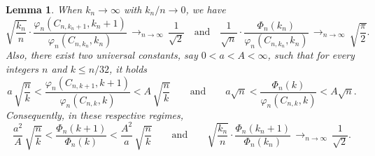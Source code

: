 \documentclass[JEP,XML,SOM,Unicode,NoFloatCountersInSection,NoEqCountersInSection]{cedram}
\theoremstyle{plain}
\newtheorem{lemma}[theorem]{Lemma}
\theoremstyle{definition}
\theoremstyle{remark}
\newcommand{\cv}[1][n]{\,\mathop{\longrightarrow}^{}_{#1 \to \infty}\,}
\begin{document}
\begin{lemma}\label{lem:phi_et_Phi}
When $k_n\to\infty$ with $k_n/n\to0$, we have
\begin{equation}\label{eq:equiv_kn}
\sqrt{\frac{k_n}{n}} \cdot \frac{\varphi_n(C_{n,k_n+1},k_n+1)}{\varphi_n(C_{n,k_n},k_n)} \cv \frac{1}{\sqrt{2}}
\quad\text{and}\quad
\frac{1}{\sqrt{n}} \cdot \frac{\Phi_n(k_n)}{\varphi_{n}(C_{n,k_n},k_n)} \cv \sqrt{\frac{\pi}{2}}.
\end{equation}
Also, there exist two universal constants, say $0 < a < A < \infty$, such that for every integers $n$ and $k \le n/32$, it holds
\begin{equation}\label{eq:bornes_ratio}
a\,\sqrt{\frac{n}{k}} < \frac{\varphi_n(C_{n,k+1},k+1)}{\varphi_n(C_{n,k},k)} < A\,\sqrt{\frac{n}{k}}
\qquad\text{and}\qquad
a\sqrt{n} < \frac{\Phi_n(k)}{\varphi_{n}(C_{n,k},k)} < A \sqrt{n}.
\end{equation}
Consequently, in these respective regimes,
\[
\frac{a^2}{A}\,\sqrt{\frac{n}{k}}
< \frac{\Phi_n(k+1)}{\Phi_n(k)}
< \frac{A^2}{a}\,\sqrt{\frac{n}{k}}
\qquad\text{and}\qquad
\sqrt{\frac{k_n}{n}} \cdot \frac{\Phi_n(k_n+1)}{\Phi_n(k_n)} \cv \frac{1}{\sqrt{2}}.
\]
\end{lemma}
\end{document}
